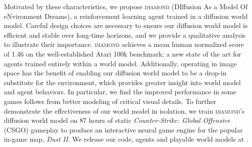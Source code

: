 Motivated by these characteristics, we propose \textsc{diamond} (DIffusion As a Model Of eNvironment Dreams), a reinforcement learning agent trained in a diffusion world model. 
Careful design choices are necessary to ensure our diffusion world model is efficient and stable over long-time horizons, and we provide a qualitative analysis to illustrate their importance.
\textsc{diamond} achieves a mean human normalized score of 1.46 on the well-established Atari 100k benchmark; a new state of the art for agents trained entirely within a world model.
Additionally, operating in image space has the benefit of enabling our diffusion world model to be a drop-in substitute for the environment, which provides greater insight into world model and agent behaviors. 
In particular, we find the improved performance in some games follows from better modeling of critical visual details. 
To further demonstrate the effectiveness of our world model in isolation, we train \textsc{diamond}'s diffusion world model on $87$ hours of static \textit{Counter-Strike: Global Offensive} (CSGO) gameplay \citep{pearce2022counter} to produce an interactive neural game engine for the popular in-game map, \textit{Dust II}.
We release our code, agents and playable world models at \wslink.

